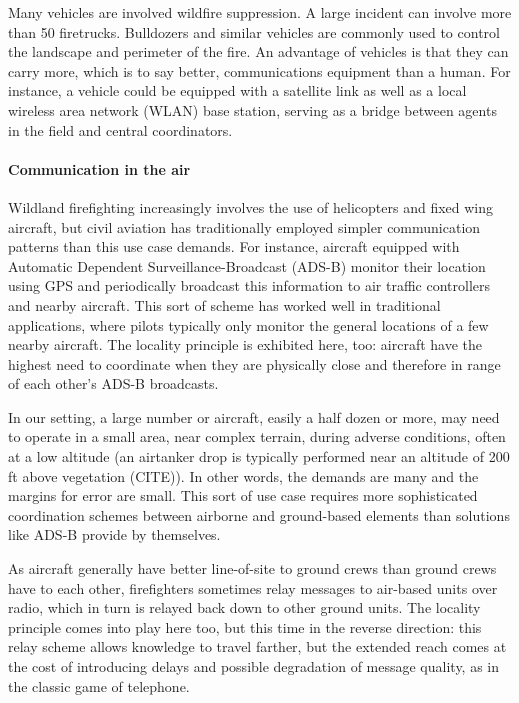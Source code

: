 \documentclass[]             %
{NASA}                       %
\theoremstyle{definition}
\begin{document}
Many vehicles are involved wildfire suppression. A large incident can
involve more than 50 firetrucks. Bulldozers and similar vehicles are
commonly used to control the landscape and perimeter of the fire. An
advantage of vehicles is that they can carry more, which is to say
better, communications equipment than a human. For instance, a vehicle
could be equipped with a satellite link as well as a local wireless area
network (WLAN) base station, serving as a bridge between agents in the
field and central coordinators.

\paragraph{Communication in the air}

Wildland firefighting increasingly involves the use of helicopters and
fixed wing aircraft, but civil aviation has traditionally employed
simpler communication patterns than this use case demands. For instance,
aircraft equipped with Automatic Dependent Surveillance-Broadcast
(ADS-B) monitor their location using GPS and periodically broadcast this
information to air traffic controllers and nearby aircraft. This sort of
scheme has worked well in traditional applications, where pilots
typically only monitor the general locations of a few nearby aircraft.
The locality principle is exhibited here, too: aircraft have the highest
need to coordinate when they are physically close and therefore in range
of each other's ADS-B broadcasts.

In our setting, a large number or aircraft, easily a half dozen or more,
may need to operate in a small area, near complex terrain, during
adverse conditions, often at a low altitude (an airtanker drop is
typically performed near an altitude of 200 ft above vegetation (CITE)).
In other words, the demands are many and the margins for error are
small. This sort of use case requires more sophisticated coordination
schemes between airborne and ground-based elements than solutions like
ADS-B provide by themselves.

As aircraft generally have better line-of-site to ground crews than
ground crews have to each other, firefighters sometimes relay messages
to air-based units over radio, which in turn is relayed back down to
other ground units. The locality principle comes into play here too, but
this time in the reverse direction: this relay scheme allows knowledge
to travel farther, but the extended reach comes at the cost of
introducing delays and possible degradation of message quality, as in
the classic game of telephone.
\end{document}

